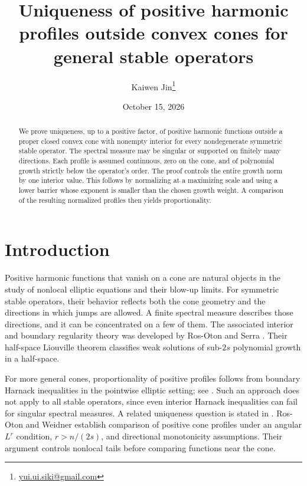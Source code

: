 \documentclass[11pt]{article}
\numberwithin{equation}{section}
\begin{document}
\title{Uniqueness of positive harmonic profiles outside convex cones\newline
for general stable operators}
\author{Kaiwen Jin\thanks{\href{mailto:yui.ui.siki@gmail.com}{yui.ui.siki@gmail.com}}}
\date{October 15, 2026}
\maketitle

\begin{abstract}
We prove uniqueness, up to a positive factor, of positive harmonic functions
outside a proper closed convex cone with nonempty interior for every
nondegenerate symmetric stable operator. The spectral measure may be singular
or supported on finitely many directions. Each profile is assumed continuous,
zero on the cone, and of polynomial growth strictly below the operator's
order. The proof controls the entire growth norm by one interior value.
This follows by normalizing at a maximizing scale and using a lower barrier
whose exponent is smaller than the chosen growth weight. A comparison of
the resulting normalized profiles then yields proportionality.
\end{abstract}

\section{Introduction}\label{sec:introduction}

Positive harmonic functions that vanish on a cone are natural objects in
the study of nonlocal elliptic equations and their blow-up limits. For
symmetric stable operators, their behavior reflects both the cone geometry
and the directions in which jumps are allowed. A finite spectral measure
describes those directions, and it can be concentrated on a few of them.
The associated interior and boundary regularity theory was developed by
Ros-Oton and Serra \cite{RS}. Their half-space Liouville theorem
\cite[Theorem 4.1]{RS} classifies weak solutions of sub-\(2s\) polynomial
growth in a half-space.

For more general cones, proportionality of positive profiles follows from
boundary Harnack inequalities in the pointwise elliptic setting; see
\cite[Proposition 4.4.5]{FR}. Such an approach does not apply to all stable
operators, since even interior Harnack inequalities can fail for singular
spectral measures. A related uniqueness question is stated in
\cite[Open question 4.4, p.~302]{FR}. Ros-Oton and Weidner
\cite[Theorem 4.6 and Corollary 4.7]{RW} establish comparison of positive
cone profiles under an angular \(L^r\) condition, \(r>n/(2s)\), and
directional monotonicity assumptions. Their argument controls nonlocal tails
before comparing functions near the cone.
\end{document}
